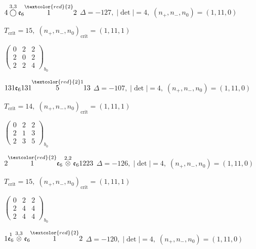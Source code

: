 \documentclass[10pt]{article}
\begin{document}
\smallskip

$4\overset{3,3}{\bigcirc}\mathfrak{e}_6\overset{\textcolor{red}{2}}{1}2$ \quad $\Delta=-127,\; |\det|=4,\; (n_+,n_-,n_0)=(1,11,0)$

\hspace{1em}$T_{\text{crit}}=15,\; (n_+,n_-,n_0)_{\text{crit}}=(1,11,1)$

\hspace{2em}$\left(\begin{smallmatrix}0 & 2 & 2 \\ 2 & 0 & 2 \\ 2 & 2 & 4\end{smallmatrix}\right)_{\!b_0}$

\smallskip

$131\mathfrak{e}_6131\overset{\textcolor{red}{2}1}{5}13$ \quad $\Delta=-107,\; |\det|=4,\; (n_+,n_-,n_0)=(1,11,0)$

\hspace{1em}$T_{\text{crit}}=14,\; (n_+,n_-,n_0)_{\text{crit}}=(1,11,1)$

\hspace{2em}$\left(\begin{smallmatrix}0 & 2 & 2 \\ 2 & 1 & 3 \\ 2 & 3 & 5\end{smallmatrix}\right)_{\!b_0}$

\smallskip

$2\overset{\textcolor{red}{2}}{1}\mathfrak{e}_6\overset{2,2}{\otimes}\mathfrak{e}_61223$ \quad $\Delta=-126,\; |\det|=4,\; (n_+,n_-,n_0)=(1,11,0)$

\hspace{1em}$T_{\text{crit}}=15,\; (n_+,n_-,n_0)_{\text{crit}}=(1,11,1)$

\hspace{2em}$\left(\begin{smallmatrix}0 & 2 & 2 \\ 2 & 4 & 4 \\ 2 & 4 & 4\end{smallmatrix}\right)_{\!b_0}$

\smallskip

$1\overset{1}{\mathfrak{e}_6}\overset{3,3}{\otimes}\mathfrak{e}_6\overset{\textcolor{red}{2}}{1}2$ \quad $\Delta=-120,\; |\det|=4,\; (n_+,n_-,n_0)=(1,11,0)$
\end{document}
